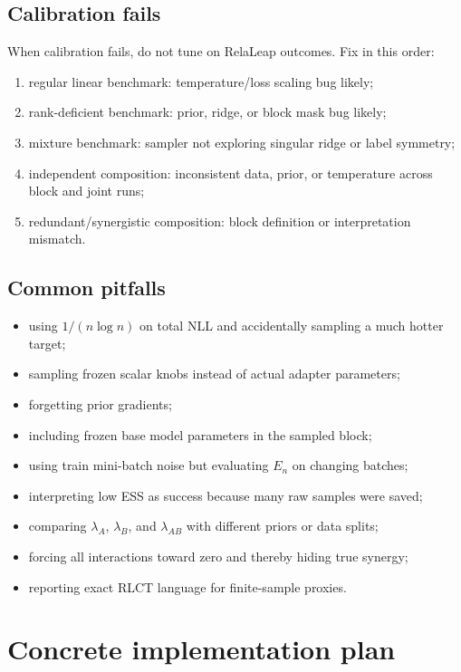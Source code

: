 \documentclass[11pt]{article}
\begin{document}
\subsection{Calibration fails}

When calibration fails, do not tune on RelaLeap outcomes.  Fix in this order:
\begin{enumerate}[(1)]
\item regular linear benchmark: temperature/loss scaling bug likely;
\item rank-deficient benchmark: prior, ridge, or block mask bug likely;
\item mixture benchmark: sampler not exploring singular ridge or label symmetry;
\item independent composition: inconsistent data, prior, or temperature across block and joint runs;
\item redundant/synergistic composition: block definition or interpretation mismatch.
\end{enumerate}

\subsection{Common pitfalls}

\begin{itemize}
\item using $1/(n\log n)$ on total NLL and accidentally sampling a much hotter target;
\item sampling frozen scalar knobs instead of actual adapter parameters;
\item forgetting prior gradients;
\item including frozen base model parameters in the sampled block;
\item using train mini-batch noise but evaluating $E_n$ on changing batches;
\item interpreting low ESS as success because many raw samples were saved;
\item comparing $\lambda_A$, $\lambda_B$, and $\lambda_{AB}$ with different priors or data splits;
\item forcing all interactions toward zero and thereby hiding true synergy;
\item reporting exact RLCT language for finite-sample proxies.
\end{itemize}

\section{Concrete implementation plan}
\end{document}
